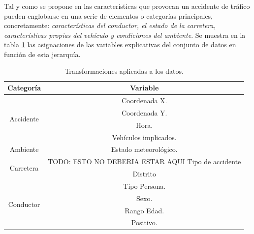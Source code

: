         Tal y como se propone en \cite{JerarquiaImagenes} las características que provocan un accidente de tráfico pueden englobarse en una serie de elementos o categorías principales, concretamente: \textit{características del conductor, el estado de la carretera, características propias del vehículo y condiciones del ambiente}. Se muestra en la tabla \ref{JerarquiaCaracteristicasTabla} las asignaciones de las variables explicativas del conjunto de datos en función de esta jerarquía.


        \begin{table}[H]
          \centering
          \begin{tabular}{ |c|c| }
               \hline
               \textbf{Categoría} & \textbf{Variable}\\

               \hline
               \multirow{4}{*}{Accidente}            & Coordenada X.\\
                                                     & Coordenada Y.\\
                                                     & Hora.\\
                                                     & Vehículos implicados.\\

               \hline
               \multirow{1}{*}{Ambiente}             & Estado meteorológico.\\

               \hline
               \multirow{2}{*}{Carretera}            & TODO: ESTO NO DEBERIA ESTAR AQUI Tipo de accidente\\
                                                     & Distrito\\

               \hline
               \multirow{4}{*}{Conductor}            & Tipo Persona.\\
                                                     & Sexo.\\
                                                     & Rango Edad.\\
                                                     & Positivo.\\

               \hline
          \end{tabular}
          \caption{Transformaciones aplicadas a los datos.}
          \label{JerarquiaCaracteristicasTabla}
        \end{table}



